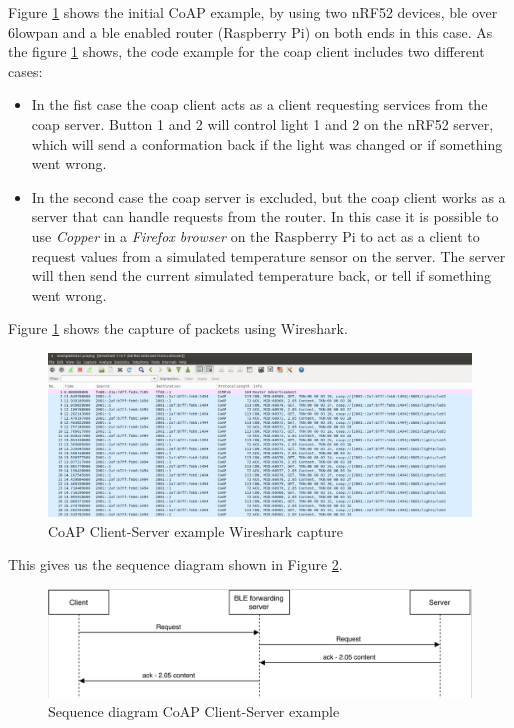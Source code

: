 Figure \ref{fig:CoAPexample1} shows the initial CoAP example, by using two nRF52 devices, \gls{ble} over \gls{6lowpan} and a \gls{ble} enabled router (Raspberry Pi) on both ends in this case. As the figure \ref{fig:CoAPexample1} shows, the code example for the \gls{coap} client includes two different cases: 

\begin{itemize}
  \item In the fist case the \gls{coap} client acts as a client requesting services from the \gls{coap} server. Button 1 and 2 will control light 1 and 2 on the nRF52 server, which will send a conformation back if the light was changed or if something went wrong.
  \item In the second case the \gls{coap} server is excluded, but the \gls{coap} client works as a server that can handle requests from the router. In this case it is possible to use \textit{Copper} in a \textit{Firefox browser} on the Raspberry Pi to act as a client to request values from a simulated temperature sensor on the server. The server will  then send the current simulated temperature back, or tell if something went wrong. 
\end{itemize} 

Figure \ref{fig:CoAPexample1} shows the capture of packets using Wireshark. 

\begin{figure}[ht]
    \centering
    \includegraphics[scale=0.27]{CoapEx1captureCropped2.png}    
    \caption{CoAP Client-Server example Wireshark capture}
    \label{fig:CoAPexample1}
\end{figure}


This gives us the sequence diagram shown in Figure \ref{fig:seq1}. 

\begin{figure}[ht]
    \centering
    \includegraphics[scale=0.27]{seq1.png}    
    \caption{Sequence diagram CoAP Client-Server example}
    \label{fig:seq1}
\end{figure}

